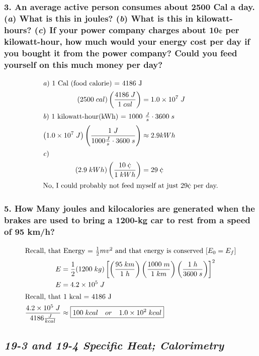 \documentclass{article}
\begin{document}
\subsubsection*{
    3. An average active person consumes about 2500 Cal a day. (\textit a) What
    is this in joules? (\textit b) What is this in kilowatt-hours? (\textit c)
    If your power company charges about 10$\cent$ per kilowatt-hour, how
    much would your energy cost per day if you bought it from the power company?
    Could you feed yourself on this much money per day?
}
\begin{align*}
    \intertext{\textit a) 1 Cal (food calorie) = 4186 J}
    \left(2500\;cal\right)\left(\frac{4186\;J}{1\;cal}\right) &= 1.0\times 10^7\;J \\
    \intertext{\textit b) 1 kilowatt-hour(kWh) = 1000 $\frac{J}{s} \cdot 3600\;s$}
    \left(1.0 \times 10^7\;J\right)\left(\frac{1\;J}{1000\frac{J}{s} \cdot 3600\;s}\right) &\approx 2.9 kWh  \\
\intertext{\textit c)}
    \left(2.9\;kWh\right)\left(\frac{10\;\cent}{1\;kWh}\right) &= 29\;\cent \\ 
    \intertext{No, I could probably not feed myself at just 29$\cent$ per day.}
\end{align*}
\subsubsection*{
    5. How Many joules and kilocalories are generated when the brakes are
    used to bring a 1200-kg car to rest from a speed of 95 km/h?
}
\begin{align*}
    \intertext{Recall, that Energy = $\frac{1}{2}mv^2$ and that energy is conserved [$E_0 = E_f$]}
    E &= \frac{1}{2}(1200\;kg)\left[\left(\frac{95\;km}{1\;h}\right)\left(\frac{1000\;m}{1\;km}\right)\left(\frac{1\;h}{3600\;s}\right)\right]^2 \\ 
    E &= 4.2 \times 10^5\;J \\ 
    \intertext{Recall, that 1 kcal = 4186 J} 
    \frac{4.2 \times 10^5\;J}{4186 \frac{J}{kcal}} &\approx \boxed{100\;kcal \quad or \quad 1.0 \times 10^2\;kcal} \\ 
\end{align*}    
\newpage
\begin{center}
    \subsection*{\textbf{\textit{19-3 and 19-4 Specific Heat; Calorimetry}}}
\end{center}
\end{document}
